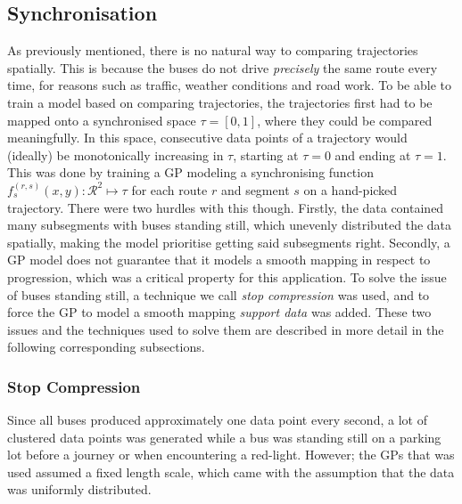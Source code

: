 \subsection{Synchronisation}
As previously mentioned, there is no natural way to comparing
trajectories spatially. This is because the buses do not drive
\textit{precisely} the same route every time, for reasons such as
traffic, weather conditions and road work. To be able to train a model
based on comparing trajectories, the trajectories first had to be
mapped onto a synchronised space $\tau = [0, 1]$, where they could be
compared meaningfully. In this space, consecutive data points of a trajectory
would (ideally) be monotonically increasing in $\tau$, starting at $\tau=0$ and
ending at $\tau=1$. This was done by training a GP modeling a
synchronising function $f^{(r,s)}_s(x, y) : \mathcal{R}^2 \mapsto
\tau$ for each route $r$ and segment $s$ on a hand-picked
trajectory. There were two hurdles with this though. Firstly, the data
contained many subsegments with buses standing still, which unevenly
distributed the data spatially, making the model prioritise getting
said subsegments right. Secondly, a GP model does not guarantee that
it models a smooth mapping in respect to progression, which was a critical property for this application. To solve the issue of buses standing still, a technique we call \textit{stop compression} was used, and to force the GP to model a smooth mapping \textit{support data} was added. These two issues and the techniques used to solve them are described in more detail in the following corresponding subsections.

\subsubsection{Stop Compression}
\label{sec:stop-compression}
Since all buses produced approximately one data point every second, a lot of clustered data points was generated while a bus was standing still on a parking lot before a journey or when encountering a red-light. However; the GPs that was used assumed a fixed length scale, which came with the assumption that the data was uniformly distributed.

